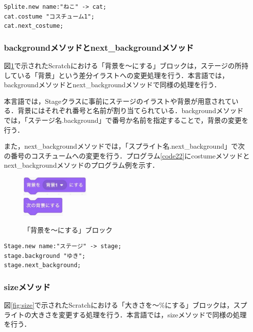 \documentclass[10pt,a4j]{ltjsarticle}
\begin{document}
\begin{lstlisting}[caption=costumeメソッドとnext\_costumeメソッドのプログラム例, label=code21]
Splite.new name:"ねこ" -> cat;
cat.costume "コスチューム1";
cat.next_costume;
\end{lstlisting}

\subsubsection{backgroundメソッドとnext\_backgroundメソッド}
図\ref{fig:background}で示されたScratchにおける「背景を〜にする」ブロックは，ステージの所持している「背景」という差分イラストへの変更処理を行う．本言語では，backgroundメソッドとnext\_backgroundメソッドで同様の処理を行う．

本言語では，Stageクラスに事前にステージのイラストや背景が用意されている．背景にはそれぞれ番号と名前が割り当てられている．backgroundメソッドでは，「ステージ名.background」で番号か名前を指定することで，背景の変更を行う．

また，next\_backgroundメソッドでは，「スプライト名.next\_background」で次の番号のコスチュームへの変更を行う．プログラム\ref{code22}にcostumeメソッドとnext\_backgroundメソッドのプログラム例を示す．

\begin{figure}[H]
  \centering
  \includegraphics[height=10mm]{images/set.pdf} \\
  \includegraphics[height=10mm]{images/next_set.pdf} 
  \caption{「背景を〜にする」ブロック}
  \label{fig:background}
\end{figure}

\begin{lstlisting}[caption=backgroundメソッドとnext\_backgroundメソッドのプログラム例, label=code22]
Stage.new name:"ステージ" -> stage;
stage.background "ゆき";
stage.next_background;
\end{lstlisting}

\subsubsection{sizeメソッド}
図\ref{fig:size}で示されたScratchにおける「大きさを〜\%にする」ブロックは，スプライトの大きさを変更する処理を行う．本言語では，sizeメソッドで同様の処理を行う．
\end{document}
